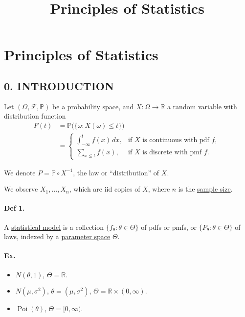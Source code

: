 \documentclass[11pt,a4paper]{article}
\title{Principles of Statistics}
\begin{document}
\maketitle
\thispagestyle{empty}
\section*{Principles of Statistics}

\subsection*{0. INTRODUCTION}

Let $(\Omega,\mathcal{F},\mathbb{P})$ be a probability space, and
$X:\Omega\to\mathbb{R}$ a random variable with distribution function
\[
\begin{aligned}
F(t)
&=
\mathbb{P}\bigl(\{\omega:X(\omega)\leq t\}\bigr) \\
&=
\begin{cases}
\displaystyle \int_{-\infty}^{t} f(x)\,dx,
& \text{if $X$ is continuous with pdf $f$}, \\[1ex]
\displaystyle \sum_{x\leq t} f(x),
& \text{if $X$ is discrete with pmf $f$}.
\end{cases}
\end{aligned}
\]

We denote $P=\mathbb{P}\circ X^{-1}$, the law or ``distribution'' of $X$.

We observe $X_1,\ldots,X_n$, which are iid copies of $X$, where $n$ is
the \underline{sample size}.

\paragraph{Def 1.}
A \underline{statistical model} is a collection
$\{f_\theta:\theta\in\Theta\}$ of pdfs or pmfs, or
$\{P_\theta:\theta\in\Theta\}$ of laws, indexed by a
\underline{parameter space} $\Theta$.

\paragraph{Ex.}
\begin{itemize}
    \item $N(\theta,1)$, \qquad $\Theta=\mathbb{R}$.
    \item $N(\mu,\sigma^2)$, \qquad
    $\theta=(\mu,\sigma^2)$, \quad
    $\Theta=\mathbb{R}\times(0,\infty)$.
    \item $\operatorname{Poi}(\theta)$, \qquad
    $\Theta=[0,\infty)$.
\end{itemize}
\end{document}

